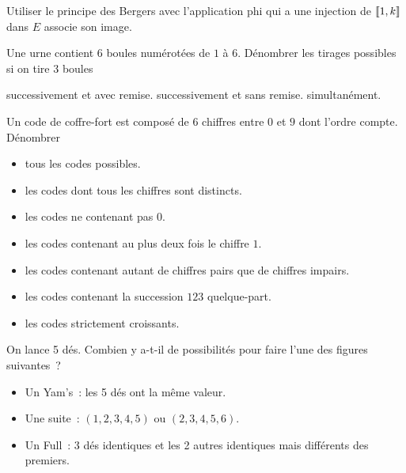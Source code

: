 \documentclass{magnolia}
\begin{document}
\begin{preuve}
  Utiliser le principe des Bergers avec l'application phi qui a une injection
  de $\left\llbracket 1,k\right\rrbracket$ dans $E$ associe son image.
  \end{preuve}

\begin{exos}
\exo Une urne contient $6$ boules numérotées de $1$ à $6$. Dénombrer les tirages
  possibles si on tire $3$ boules
  \begin{itemize}
  \question successivement et avec remise.
  \question successivement et sans remise.
  \question simultanément.
  \end{itemize}
\exo Un code de coffre-fort est composé de 6 chiffres entre $0$ et $9$ dont l'ordre
  compte. Dénombrer 
  \begin{itemize}
  \item tous les codes possibles.
  \item les codes dont tous les chiffres sont distincts.
  \item les codes ne contenant pas $0$.
  \item les codes contenant au plus deux fois le chiffre $1$.
  \item les codes contenant autant de chiffres pairs que de chiffres impairs.
  \item les codes contenant la succession $123$ quelque-part.
  \item les codes strictement croissants.
  \end{itemize}
\exo On lance 5 dés. Combien y a-t-il de possibilités pour faire l'une des
  figures suivantes~?
  \begin{itemize}
  \item Un Yam's~: les 5 dés ont la même valeur.
  \item Une suite~: $(1,2,3,4,5)$ ou $(2,3,4,5,6)$.
  \item Un Full~: 3 dés identiques et les 2 autres identiques mais différents des premiers.
  \end{itemize}

\end{exos}
\end{document}
